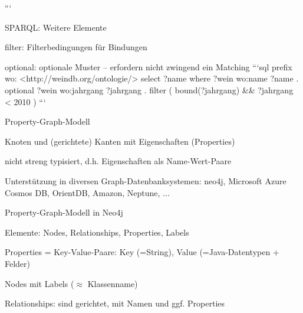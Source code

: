 \documentclass[a4paper]{article}
\begin{document}
\begin{multicols}{3}
\begin{itemize*}
\begin{itemize*}
\begin{itemize*}
                ```
            \end{itemize*}
            \item SPARQL: Weitere Elemente
            \begin{itemize*}
                \item filter: Filterbedingungen für Bindungen
                \item optional: optionale Muster – erfordern nicht zwingend ein Matching
                ```sql
                prefix wo: <http://weindb.org/ontologie/>
                select ?name
                where { ?wein wo:name ?name . }
                optional { ?wein wo:jahrgang ?jahrgang } .
                filter ( bound(?jahrgang) \&\& ?jahrgang < 2010 )
                ```
            \end{itemize*}
        \end{itemize*}

        Property-Graph-Modell
        \begin{itemize*}
            \item Knoten und (gerichtete) Kanten mit Eigenschaften (Properties)
            \item nicht streng typisiert, d.h. Eigenschaften als Name-Wert-Paare
            \item Unterstützung in diversen Graph-Datenbanksystemen: neo4j, Microsoft Azure Cosmos DB, OrientDB, Amazon, Neptune, ...
            \item Property-Graph-Modell in Neo4j
            \begin{itemize*}
                \item Elemente: Nodes, Relationships, Properties, Labels
                \item Properties = Key-Value-Paare: Key (=String), Value (=Java-Datentypen + Felder)
                \item Nodes mit Labels ($\approx$ Klassenname)
                \item Relationships: sind gerichtet, mit Namen und ggf. Properties
            \end{itemize*}
        \end{itemize*}


\end{itemize*}
\end{multicols}
\end{document}
